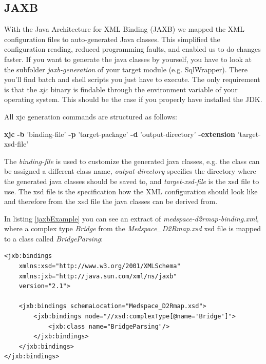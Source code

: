 \subsection{JAXB}

With the Java Architecture for XML Binding \cite{JAXB} (JAXB) we mapped the XML configuration files to auto-generated Java classes. This simplified the configuration reading, reduced programming faults, and enabled us to do changes faster. If you want to generate the java classes by yourself, you have to look at the subfolder \emph{jaxb-generation} of your target module (e.g. SqlWrapper). There you'll find batch and shell scripts you just have to execute. The only requirement is that the \emph{xjc} binary is findable through the environment variable of your operating system. This should be the case if you properly have installed the JDK.

All xjc generation commands are structured as follows:

\begin{codebox}
	\textbf{xjc} \textbf{-b} 'binding-file' \textbf{-p} 'target-package' \textbf{-d} 'output-directory' \textbf{-extension} 'target-xsd-file'
\end{codebox}

The \emph{binding-file} is used to customize the generated java classes, e.g. the class can be assigned a different class name, \emph{output-directory} specifies the directory where the generated java classes should be saved to, and \emph{target-xsd-file} is the xsd file to use. The xsd file is the specification how the XML configuration should look like and therefore from the xsd file the java classes can be derived from.

In listing \ref{jaxbExample} you can see an extract of \emph{medspace-d2rmap-binding.xml}, where a complex type \emph{Bridge} from the \emph{Medspace\_D2Rmap.xsd} xsd file is mapped to a class called \emph{BridgeParsing}:

\begin{lstlisting}[style=RdfCodeStyle, caption=JAXB binding example, label=jaxbExample]
<jxb:bindings 
    xmlns:xsd="http://www.w3.org/2001/XMLSchema"
    xmlns:jxb="http://java.sun.com/xml/ns/jaxb"
    version="2.1">

    <jxb:bindings schemaLocation="Medspace_D2Rmap.xsd">
		<jxb:bindings node="//xsd:complexType[@name='Bridge']">
			<jxb:class name="BridgeParsing"/>
		</jxb:bindings>
    </jxb:bindings>
</jxb:bindings>
\end{lstlisting}

